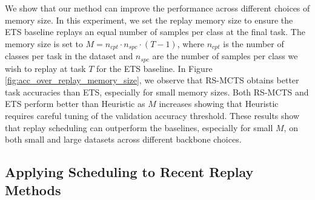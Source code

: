 We show that our method can improve the performance across different choices of memory size.
In this experiment, we set the replay memory size to ensure the ETS baseline replays an equal number of samples per class at the final task. 
The memory size is set to $M = n_{cpt} \cdot n_{spc} \cdot (T-1)$, where $n_{cpt}$ is the number of classes per task in the dataset and $n_{spc}$ are the number of samples per class we wish to replay at task $T$ for the ETS baseline. 
In Figure \ref{fig:acc_over_replay_memory_size}, we observe that RS-MCTS obtains better task accuracies than ETS, especially for small memory sizes. Both RS-MCTS and ETS perform better than Heuristic as $M$ increases showing that Heuristic requires careful tuning of the validation accuracy threshold. These results show that replay scheduling can outperform the baselines, especially for small $M$, on both small and large datasets across different backbone choices.


%
\begin{table}[t]
	\centering
	\caption{
    Performance comparison with ACC between scheduling methods RS-MCTS (Ours), Random, ETS, and Heuristic combined with replay-based methods HAL, MER, and DER. %
	Replay memory sizes are $M=10$ and $M=100$ for the 5-task and 10/20-task datasets respectively. We report the mean and standard deviation averaged over 5 seeds. Results on Heuristic where some seed did not converge is denoted by $^{*}$. Applying RS-MCTS to each method can enhance the performance compared to using the baseline schedules. 
	}
	\vspace{-3mm}
	\resizebox{0.98\textwidth}{!}{ %
			
		}
		\vspace{-3mm}
		\label{tab:results_applying_scheduling_to_recent_replay_methods}
	\end{table}

%
\subsection{Applying Scheduling to Recent Replay Methods}\label{paperC:sec:applying_scheduling_to_recent_replay_methods}

